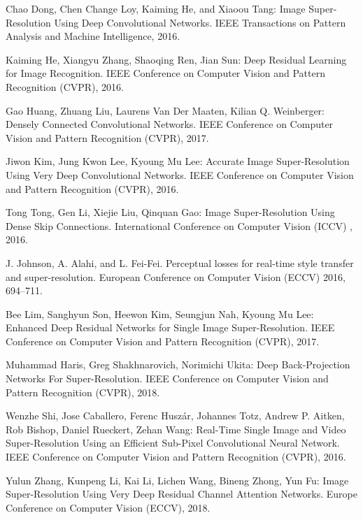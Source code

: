 \documentclass[runningheads]{llncs}
\begin{document}
\begin{thebibliography}{8}
Chao Dong, Chen Change Loy, Kaiming He, and Xiaoou Tang: Image Super-Resolution Using Deep Convolutional Networks. IEEE Transactions on Pattern Analysis and Machine Intelligence, 2016. 

Kaiming He, Xiangyu Zhang, Shaoqing Ren, Jian Sun: Deep Residual Learning for Image Recognition. IEEE Conference on Computer Vision and Pattern Recognition (CVPR), 2016.

Gao Huang, Zhuang Liu, Laurens Van Der Maaten, Kilian Q. Weinberger: Densely Connected Convolutional Networks. IEEE Conference on Computer Vision and Pattern Recognition (CVPR), 2017.

Jiwon Kim, Jung Kwon Lee, Kyoung Mu Lee: Accurate Image Super-Resolution Using Very Deep Convolutional Networks. IEEE Conference on Computer Vision and Pattern Recognition (CVPR), 2016.

Tong Tong, Gen Li, Xiejie Liu, Qinquan Gao: Image Super-Resolution Using Dense Skip Connections. International Conference on Computer Vision (ICCV) , 2016.

J. Johnson, A. Alahi, and L. Fei-Fei. Perceptual losses for real-time style transfer and super-resolution. European Conference on Computer Vision (ECCV) 2016, 694–711.

Bee Lim, Sanghyun Son, Heewon Kim, Seungjun Nah, Kyoung Mu Lee: Enhanced Deep Residual Networks for Single Image Super-Resolution. IEEE Conference on Computer Vision and Pattern Recognition (CVPR), 2017.

Muhammad Haris, Greg Shakhnarovich, Norimichi Ukita: Deep Back-Projection Networks For Super-Resolution. IEEE Conference on Computer Vision and Pattern Recognition (CVPR), 2018.

Wenzhe Shi, Jose Caballero, Ferenc Huszár, Johannes Totz, Andrew P. Aitken, Rob Bishop, Daniel Rueckert, Zehan Wang: Real-Time Single Image and Video Super-Resolution Using an Efficient Sub-Pixel Convolutional Neural Network. IEEE Conference on Computer Vision and Pattern Recognition (CVPR), 2016.

Yulun Zhang, Kunpeng Li, Kai Li, Lichen Wang, Bineng Zhong, Yun Fu: Image Super-Resolution Using Very Deep Residual Channel Attention Networks. Europe Conference on Computer Vision (ECCV), 2018.


\end{thebibliography}
\end{document}
